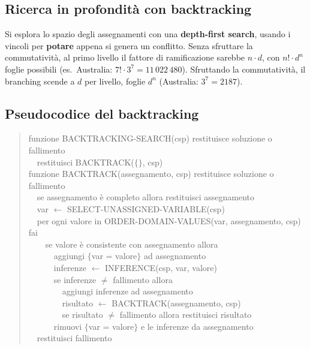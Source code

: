 \documentclass[11pt,a4paper]{report}
\begin{document}
\subsection*{Ricerca in profondità con backtracking}

Si esplora lo spazio degli assegnamenti con una \textbf{depth-first search}, usando i vincoli per \textbf{potare} appena si genera un conflitto. Senza sfruttare la commutatività, al primo livello il fattore di ramificazione sarebbe $n\cdot d$, con $n!\cdot d^n$ foglie possibili (es.\ Australia: $7!\cdot 3^7=11\,022\,480$). Sfruttando la commutatività, il branching scende a $d$ per livello, foglie $d^n$ (Australia: $3^7=2187$).

\subsection*{Pseudocodice del backtracking}

\begin{quote}
\ttfamily
funzione BACKTRACKING-SEARCH(csp) restituisce soluzione o fallimento\\
\ \ restituisci BACKTRACK($\{\}$, csp)\\[4pt]
funzione BACKTRACK(assegnamento, csp) restituisce soluzione o fallimento\\
\ \ se assegnamento è completo allora restituisci assegnamento\\
\ \ var $\leftarrow$ SELECT-UNASSIGNED-VARIABLE(csp)\\
\ \ per ogni valore in ORDER-DOMAIN-VALUES(var, assegnamento, csp) fai\\
\ \ \ \ se valore è consistente con assegnamento allora\\
\ \ \ \ \ \ aggiungi $\{$var = valore$\}$ ad assegnamento\\
\ \ \ \ \ \ inferenze $\leftarrow$ INFERENCE(csp, var, valore)\\
\ \ \ \ \ \ se inferenze $\ne$ fallimento allora\\
\ \ \ \ \ \ \ \ aggiungi inferenze ad assegnamento\\
\ \ \ \ \ \ \ \ risultato $\leftarrow$ BACKTRACK(assegnamento, csp)\\
\ \ \ \ \ \ \ \ se risultato $\ne$ fallimento allora restituisci risultato\\
\ \ \ \ \ \ rimuovi $\{$var = valore$\}$ e le inferenze da assegnamento\\
\ \ restituisci fallimento
\end{quote}
\end{document}

